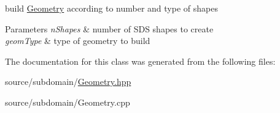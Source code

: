 build \hyperlink{classGeometry}{Geometry} according to number and type of shapes


\begin{DoxyParams}{Parameters}
{\em n\+Shapes} & number of S\+DS shapes to create \\
\hline
{\em geom\+Type} & type of geometry to build \\
\hline
\end{DoxyParams}


The documentation for this class was generated from the following files\+:\begin{DoxyCompactItemize}
\item 
source/subdomain/\hyperlink{source_2subdomain_2Geometry_8hpp}{Geometry.\+hpp}\item 
source/subdomain/Geometry.\+cpp\end{DoxyCompactItemize}
